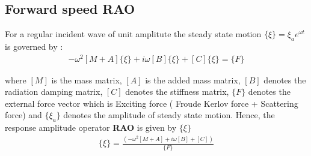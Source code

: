\subsection{Forward speed RAO}
For a regular incident wave of unit amplitute the steady state motion  $\{\xi\} = \xi_a e^{\omega t}$
is governed by :
\begin{align}
    -\omega^2[M + A]\{\xi\} + i\omega[B]\{\xi\} + [C]\{\xi\} = \{F\}
\end{align}

where $[M]$ is the mass matrix, $[A]$ is the added mass matrix, 
$[B]$ denotes the radiation damping matrix, $[C]$ denotes the stiffness matrix, 
$\{F\}$ denotes the external force vector which is Exciting force ( Froude Kerlov force + Scattering force) 
and $\{\xi_a\}$ denotes the amplitude of steady state motion. 
Hence, the response amplitude operator {\bf RAO} is given by $\{\xi\}$ 
\begin{align}
    \{\xi\} = \frac{\left(-\omega^2[M + A] + i\omega[B] + [C]\right)} {\{F\}}
\end{align}
